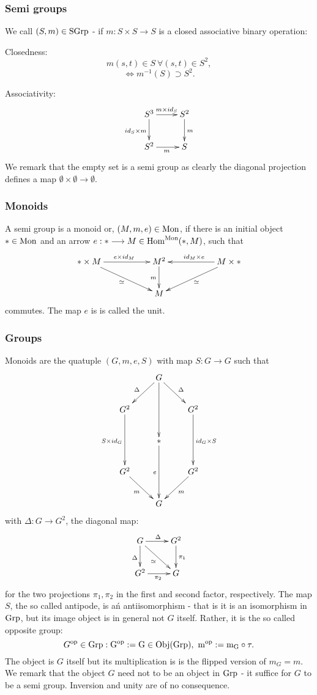 \subsubsection{Semi groups} We call $(S, m) \in \mathrm{SGrp}$ - if $m : S \times S \longrightarrow S$ is a closed associative binary operation:
\bn
\item Closedness:
$$m(s,t) \in S\ \forall (s,t) \in S^2,$$
$$\Leftrightarrow m^{-1}(S) \supset S^2.$$
\item Associativity: 
$$\xymatrix{
S^3 \ar[r]^{m \times id_S}\ar[d]_{id_S \times m}& S^2 \ar[d]^m\\
S^2 \ar[r]_m &S\\
}
$$
\en
We remark that the empty set is a semi group as clearly the diagonal projection defines a map $\emptyset \times \emptyset \longrightarrow \emptyset$.
\subsubsection{Monoids} A semi group is a monoid or, $(M, m, e) \in \mathrm{Mon}$, if there is an initial object $\ast \in \mathrm{Mon}$ and an arrow $e : \ast \longrightarrow M \in \mathrm{Hom}^{\mathrm{Mon}}(\ast,M)$, such that
$$\xymatrix{
\ast \times M \ar[rr]^{e \times id_M}\ar[rrd]_\simeq&&M^2 \ar[d]_m&&M \times \ast\ar[ll]_{id_M \times e} \ar[lld]^{\simeq}\\
&&M&&\\
}$$
commutes. The map $e$ is is called the unit.
\subsubsection{Groups} Monoids are the quatuple $(G,m,e,S)$ with map $S : G \longrightarrow G$ such that
$$\xymatrix{
&G \ar[rd]^\Delta\ar[ld]_\Delta\ar[dd]&\\
G^2\ar[dd]_{S \times id_G}&&G^2\ar[dd]^{id_G \times S}\\
&\ast\ar[dd]_e&\\
G^2\ar[rd]_m&&G^2\ar[ld]^m\\
&G&\\
}$$
with $\Delta : G \longrightarrow G^2$, the diagonal map:
$$\xymatrix{
G \ar[r]^\Delta\ar[d]_\Delta\ar[rd]_\simeq&G^2\ar[d]^{\pi_1}\\
G^2\ar[r]_{\pi_2}&G\\
}$$
for the two projections $\pi_1, \pi_2$ in the first and second factor, respectively. The map $S$, the so called antipode, is ań antiisomorphism - that is it is an isomorphism in $\rm{Grp}$, but its image object is in general not $G$ itself. Rather, it is the so called opposite group:
$$\op{G} \in \grp: \op{G} := G \in \obj{\grp},\ \op{m} := m_G \circ \tau.$$
The object is $G$ itself but its multiplication is is the flipped version of $m_G = m$. We remark that the object $G$ need not to be an object in $\rm{Grp}$ - it suffice for $G$ to be a semi group. Inversion and unity are of no consequence.

